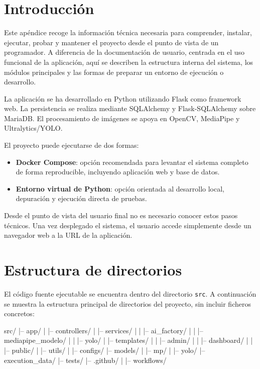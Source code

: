 
\section{Introducción}

Este apéndice recoge la información técnica necesaria para comprender, instalar, ejecutar, probar y mantener el proyecto desde el punto de vista de un programador. A diferencia de la documentación de usuario, centrada en el uso funcional de la aplicación, aquí se describen la estructura interna del sistema, los módulos principales y las formas de preparar un entorno de ejecución o desarrollo.

La aplicación se ha desarrollado en Python utilizando Flask como framework web. La persistencia se realiza mediante SQLAlchemy y Flask-SQLAlchemy sobre MariaDB. El procesamiento de imágenes se apoya en OpenCV, MediaPipe y Ultralytics/YOLO.

El proyecto puede ejecutarse de dos formas:

\begin{itemize}
	\item \textbf{Docker Compose}: opción recomendada para levantar el sistema completo de forma reproducible, incluyendo aplicación web y base de datos.
	\item \textbf{Entorno virtual de Python}: opción orientada al desarrollo local, depuración y ejecución directa de pruebas.
\end{itemize}

Desde el punto de vista del usuario final no es necesario conocer estos pasos técnicos. Una vez desplegado el sistema, el usuario accede simplemente desde un navegador web a la URL de la aplicación.

\section{Estructura de directorios}

El código fuente ejecutable se encuentra dentro del directorio \texttt{src}. A continuación se muestra la estructura principal de directorios del proyecto, sin incluir ficheros concretos:

\begin{bloqueCodigo}[title={Estructura principal de directorios}]
	src/
	|-- app/
	|   |-- controllers/
	|   |-- services/
	|   |   |-- ai_factory/
	|   |       |-- mediapipe_modelo/
	|   |       |-- yolo/
	|   |-- templates/
	|   |   |-- admin/
	|   |   |-- dashboard/
	|   |   |-- public/
	|   |-- utils/
	|
	|-- configs/
	|-- models/
	|   |-- mp/
	|   |-- yolo/
	|-- execution_data/
	|-- tests/
	|-- .github/
	|	|-- workflows/
\end{bloqueCodigo}

